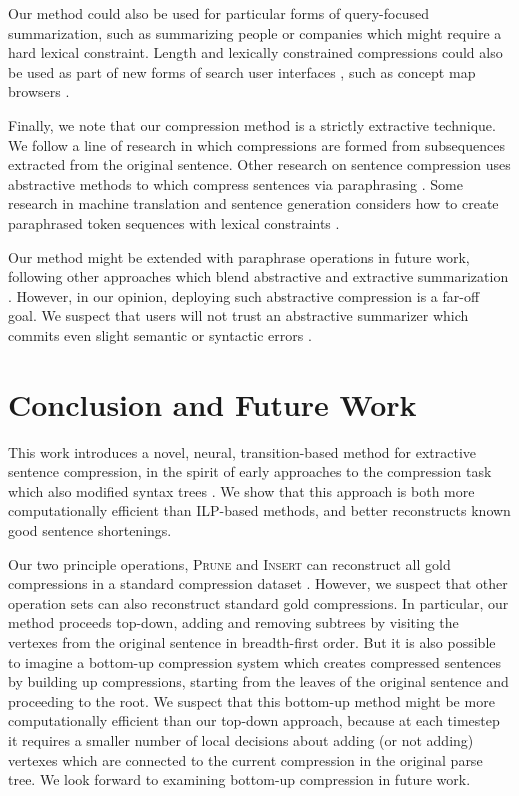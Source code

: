 \documentclass[11pt,a4paper]{article}
\begin{document}
Our method could also be used for particular forms of query-focused summarization, such as summarizing people \cite{w04} or companies \cite{filippova2009company} which might require a hard lexical constraint.  Length and lexically constrained compressions could also be used as part of new forms of search user interfaces \cite{hearst2009search}, such as concept map browsers \cite{falke2017graphdocexplore}. 

Finally, we note that our compression method is a strictly extractive technique. We follow a line of research \cite{clarke2008global,filippova2008dependency,filippova2015sentence} in which compressions are formed from subsequences extracted from the original sentence. Other research on sentence compression uses abstractive methods to which compress sentences via paraphrasing \cite{cohn2008sentence,rush2015neural,mallinson18}. Some research in machine translation and sentence generation considers how to create paraphrased token sequences with lexical constraints \cite{N18-1119,aaimh}. 

Our method might be extended with paraphrase operations in future work, following other approaches which blend abstractive and extractive summarization \cite{P17-1099}. However, in our opinion, deploying such abstractive compression is a far-off goal. We suspect that users will not trust an abstractive summarizer which commits even slight semantic or syntactic errors \cite{Handler17,Zhang}.

\section{Conclusion and Future Work}

This work introduces a novel, neural, transition-based method for extractive sentence compression, in the spirit of early approaches to the compression task which also modified syntax trees \cite{Jing2000SentenceRF,Knight2000StatisticsBasedS}. We show that this approach is both more computationally efficient than ILP-based methods, and better reconstructs known good sentence shortenings. 

Our two principle operations, \textsc{Prune} and \textsc{Insert} can reconstruct all gold compressions in a standard compression dataset \cite{filippova2013overcoming}. However, we suspect that other operation sets can also reconstruct standard gold compressions. In particular, our method proceeds top-down, adding and removing subtrees by visiting the vertexes from the original sentence in breadth-first order. But it is also possible to imagine a bottom-up compression system which creates compressed sentences by building up compressions, starting from the leaves of the original sentence and proceeding to the root. We suspect that this bottom-up method might be more computationally efficient than our top-down approach, because at each timestep it requires a smaller number of local decisions about adding (or not adding) vertexes which are connected to the current compression in the original parse tree. We look forward to examining bottom-up compression in future work. 
\end{document}
